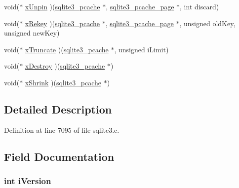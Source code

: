 \begin{DoxyCompactItemize}
void($\ast$ \hyperlink{structsqlite3__pcache__methods2_a42b88cf10674fe3de0f6c266c5cafd2d}{x\+Unpin} )(\hyperlink{sqlite3_8c_a096c453d937d51f7926d7d31c8e0bd2f}{sqlite3\+\_\+pcache} $\ast$, \hyperlink{structsqlite3__pcache__page}{sqlite3\+\_\+pcache\+\_\+page} $\ast$, int discard)
\item 
void($\ast$ \hyperlink{structsqlite3__pcache__methods2_a34e0336506633df06d0097e3cd1efc3c}{x\+Rekey} )(\hyperlink{sqlite3_8c_a096c453d937d51f7926d7d31c8e0bd2f}{sqlite3\+\_\+pcache} $\ast$, \hyperlink{structsqlite3__pcache__page}{sqlite3\+\_\+pcache\+\_\+page} $\ast$, unsigned old\+Key, unsigned new\+Key)
\item 
void($\ast$ \hyperlink{structsqlite3__pcache__methods2_a1c61888ab80e7d81e2815f0fea2d87a0}{x\+Truncate} )(\hyperlink{sqlite3_8c_a096c453d937d51f7926d7d31c8e0bd2f}{sqlite3\+\_\+pcache} $\ast$, unsigned i\+Limit)
\item 
void($\ast$ \hyperlink{structsqlite3__pcache__methods2_ac818e6091765fe201ab5727d515141a7}{x\+Destroy} )(\hyperlink{sqlite3_8c_a096c453d937d51f7926d7d31c8e0bd2f}{sqlite3\+\_\+pcache} $\ast$)
\item 
void($\ast$ \hyperlink{structsqlite3__pcache__methods2_ac4b52039f04b209c29fe57cff1a6cf08}{x\+Shrink} )(\hyperlink{sqlite3_8c_a096c453d937d51f7926d7d31c8e0bd2f}{sqlite3\+\_\+pcache} $\ast$)
\end{DoxyCompactItemize}


\subsection{Detailed Description}


Definition at line 7095 of file sqlite3.\+c.



\subsection{Field Documentation}
\hypertarget{structsqlite3__pcache__methods2_a1138620d71393e6105389670719d9685}{}
\subsubsection[{i\+Version}]{\setlength{\rightskip}{0pt plus 5cm}int i\+Version}\label{structsqlite3__pcache__methods2_a1138620d71393e6105389670719d9685}



